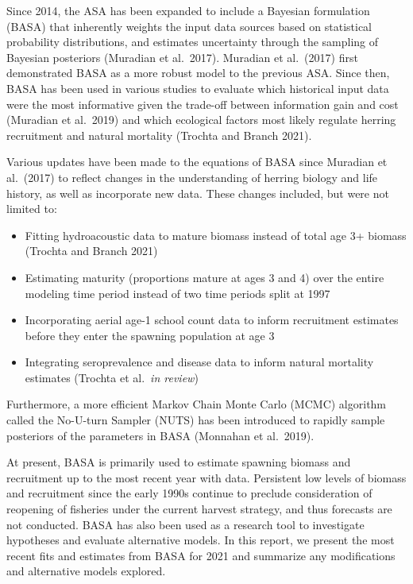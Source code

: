 \documentclass[
  11pt,
]{article}
\providecommand{\tightlist}{%
  \setlength{\itemsep}{0pt}\setlength{\parskip}{0pt}}
\begin{document}
Since 2014, the ASA has been expanded to include a Bayesian formulation
(BASA) that inherently weights the input data sources based on
statistical probability distributions, and estimates uncertainty through
the sampling of Bayesian posteriors (Muradian et al.~2017). Muradian et
al.~(2017) first demonstrated BASA as a more robust model to the
previous ASA. Since then, BASA has been used in various studies to
evaluate which historical input data were the most informative given the
trade-off between information gain and cost (Muradian et al.~2019) and
which ecological factors most likely regulate herring recruitment and
natural mortality (Trochta and Branch 2021).

Various updates have been made to the equations of BASA since Muradian
et al.~(2017) to reflect changes in the understanding of herring biology
and life history, as well as incorporate new data. These changes
included, but were not limited to:

\begin{itemize}
\tightlist
\item
  Fitting hydroacoustic data to mature biomass instead of total age 3+
  biomass (Trochta and Branch 2021)
\item
  Estimating maturity (proportions mature at ages 3 and 4) over the
  entire modeling time period instead of two time periods split at 1997
\item
  Incorporating aerial age-1 school count data to inform recruitment
  estimates before they enter the spawning population at age 3
\item
  Integrating seroprevalence and disease data to inform natural
  mortality estimates (Trochta et al.~\emph{in review})
\end{itemize}

Furthermore, a more efficient Markov Chain Monte Carlo (MCMC) algorithm
called the No-U-turn Sampler (NUTS) has been introduced to rapidly
sample posteriors of the parameters in BASA (Monnahan et al.~2019).

At present, BASA is primarily used to estimate spawning biomass and
recruitment up to the most recent year with data. Persistent low levels
of biomass and recruitment since the early 1990s continue to preclude
consideration of reopening of fisheries under the current harvest
strategy, and thus forecasts are not conducted. BASA has also been used
as a research tool to investigate hypotheses and evaluate alternative
models. In this report, we present the most recent fits and estimates
from BASA for 2021 and summarize any modifications and alternative
models explored.
\end{document}
